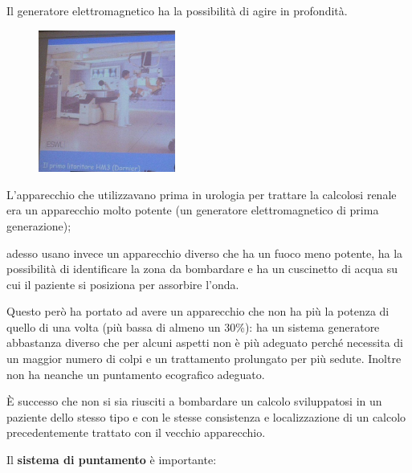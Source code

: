 Il generatore elettromagnetico ha la possibilità di agire in profondità.

\begin{figure}[!ht]
\centering
\includegraphics[width=0.4\textwidth]{025/image6.jpeg}
\end{figure}

L'apparecchio
che utilizzavano prima in urologia per trattare la calcolosi renale era
un apparecchio molto potente (un generatore elettromagnetico di prima
generazione);

adesso usano invece un apparecchio diverso che ha un fuoco meno potente,
ha la possibilità di identificare la zona da bombardare e ha un
cuscinetto di acqua su cui il paziente si posiziona per assorbire
l'onda.

Questo però ha portato ad avere un apparecchio che non ha più la potenza
di quello di una volta (più bassa di almeno un 30\%): ha un sistema
generatore abbastanza diverso che per alcuni aspetti non è più adeguato
perché necessita di un maggior numero di colpi e un trattamento
prolungato per più sedute. Inoltre non ha neanche un puntamento
ecografico adeguato.

È successo che non si sia riusciti a bombardare un calcolo sviluppatosi
in un paziente dello stesso tipo e con le stesse consistenza e
localizzazione di un calcolo precedentemente trattato con il vecchio
apparecchio.

Il \textbf{sistema di puntamento} è importante:

